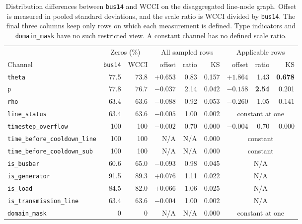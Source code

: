 \begin{table}[H]
  \centering
  \small
  \caption{Distribution differences between \texttt{bus14} and WCCI on the
  disaggregated line-node graph. Offset is measured in pooled standard
  deviations, and the scale ratio is WCCI divided by \texttt{bus14}. The final
  three columns keep only rows on which each measurement is defined. Type
  indicators and \texttt{domain\_mask} have no such restricted view. A constant
  channel has no defined scale ratio.}
  \label{tab:wcci-shift}
  \setlength{\tabcolsep}{4pt}
  \begin{tabular}{lrrrrrrrr}
    \toprule
    & \multicolumn{2}{c}{Zeros (\%)} & \multicolumn{3}{c}{All sampled rows}
    & \multicolumn{3}{c}{Applicable rows} \\
    \cmidrule(lr){2-3}\cmidrule(lr){4-6}\cmidrule(lr){7-9}
    Channel & \texttt{bus14} & WCCI & offset & ratio & KS & offset & ratio & KS \\
    \midrule
    \texttt{theta}  & 77.5 & 73.8 & $+0.653$ & 0.83 & 0.157 & $+1.864$ & 1.43 & \textbf{0.678} \\
    \texttt{p}      & 77.8 & 76.7 & $-0.037$ & 2.14 & 0.042 & $-0.158$ & \textbf{2.54} & 0.201 \\
    \texttt{rho}    & 63.4 & 63.6 & $-0.088$ & 0.92 & 0.053 & $-0.260$ & 1.05 & 0.141 \\
    \texttt{line\_status} & 63.4 & 63.6 & $-0.005$ & 1.00 & 0.002 & \multicolumn{3}{c}{constant at one} \\
    \texttt{timestep\_overflow} & 100 & 100 & $-0.002$ & 0.70 & 0.000 & $-0.004$ & 0.70 & 0.000 \\
    \texttt{time\_before\_cooldown\_line} & 100 & 100 & N/A & N/A & 0.000 & \multicolumn{3}{c}{constant} \\
    \texttt{time\_before\_cooldown\_sub}  & 100 & 100 & N/A & N/A & 0.000 & \multicolumn{3}{c}{constant} \\
    \midrule
    \texttt{is\_busbar}   & 60.6 & 65.0 & $-0.093$ & 0.98 & 0.045 & \multicolumn{3}{c}{N/A} \\
    \texttt{is\_generator} & 91.5 & 89.3 & $+0.076$ & 1.11 & 0.022 & \multicolumn{3}{c}{N/A} \\
    \texttt{is\_load}      & 84.5 & 82.0 & $+0.066$ & 1.06 & 0.025 & \multicolumn{3}{c}{N/A} \\
    \texttt{is\_transmission\_line} & 63.4 & 63.6 & $-0.004$ & 1.00 & 0.002 & \multicolumn{3}{c}{N/A} \\
    \texttt{domain\_mask}  & 0 & 0 & N/A & N/A & 0.000 & \multicolumn{3}{c}{constant at one} \\
    \bottomrule
  \end{tabular}
\end{table}

